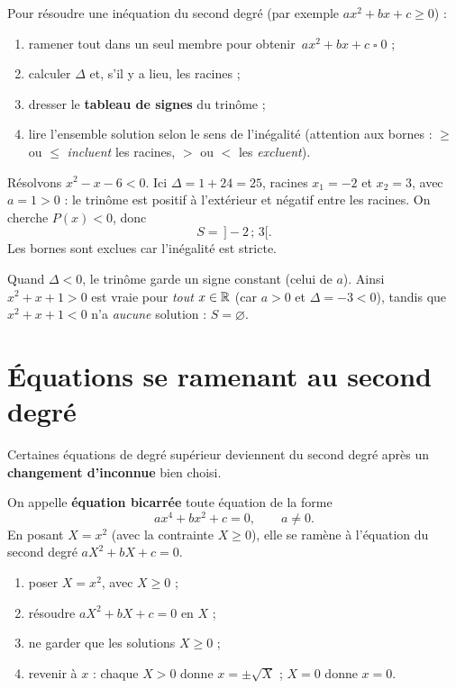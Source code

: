 \begin{aretenir}
Pour résoudre une inéquation du second degré (par exemple $ax^2+bx+c\ge 0$) :
\begin{enumerate}
  \item ramener tout dans un seul membre pour obtenir $\,ax^2+bx+c \;\square\; 0$ ;
  \item calculer $\Delta$ et, s'il y a lieu, les racines ;
  \item dresser le \textbf{tableau de signes} du trinôme ;
  \item lire l'ensemble solution selon le sens de l'inégalité (attention aux bornes :
        $\ge$ ou $\le$ \emph{incluent} les racines, $>$ ou $<$ les \emph{excluent}).
\end{enumerate}
\end{aretenir}

\begin{exemple}
Résolvons $x^2-x-6<0$. Ici $\Delta=1+24=25$, racines $x_1=-2$ et $x_2=3$, avec
$a=1>0$ : le trinôme est positif à l'extérieur et négatif entre les racines. On
cherche $P(x)<0$, donc
\[ S=\,]-2\,;\,3[. \]
Les bornes sont exclues car l'inégalité est stricte.
\end{exemple}

\begin{remarque}
Quand $\Delta<0$, le trinôme garde un signe constant (celui de $a$). Ainsi
$x^2+x+1>0$ est vraie pour \emph{tout} $x\in\mathbb{R}$ (car $a>0$ et $\Delta=-3<0$), tandis
que $x^2+x+1<0$ n'a \emph{aucune} solution : $S=\varnothing$.
\end{remarque}

\section{Équations se ramenant au second degré}

Certaines équations de degré supérieur deviennent du second degré après un
\textbf{changement d'inconnue} bien choisi.

\begin{definition}
On appelle \textbf{équation bicarrée} toute équation de la forme
\[ ax^4+bx^2+c=0, \qquad a\neq 0. \]
En posant $X=x^2$ (avec la contrainte $X\ge 0$), elle se ramène à l'équation du
second degré $aX^2+bX+c=0$.
\end{definition}

\begin{aretenir}
\begin{enumerate}
  \item poser $X=x^2$, avec $X\ge 0$ ;
  \item résoudre $aX^2+bX+c=0$ en $X$ ;
  \item ne garder que les solutions $X\ge 0$ ;
  \item revenir à $x$ : chaque $X>0$ donne $x=\pm\sqrt{X}$ ; $X=0$ donne $x=0$.
\end{enumerate}
\end{aretenir}

